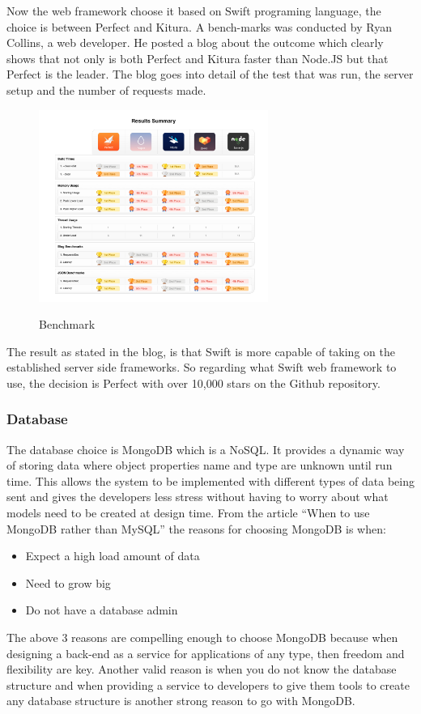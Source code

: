 Now the web framework choose it based on Swift programing language, the choice is between Perfect and Kitura. A bench-marks was conducted by Ryan Collins, a web developer. He posted a blog about the outcome \cite{benchmark} which clearly shows that not only is both Perfect and Kitura faster than Node.JS but that Perfect is the leader. The blog goes into detail of the test that was run, the server setup and the number of requests made.

\begin{figure}[!h]
    \caption{Benchmark}
    \centering
    \includegraphics[width=75mm]{images/benchmarks}
    \label{fig:label}
\end{figure}

The result as stated in the blog, is that Swift is more capable of taking on the established server side frameworks. So regarding what Swift web framework to use, the decision is Perfect with over 10,000 stars on the Github repository. \cite{github1} 

\subsubsection{Database}
The database choice is MongoDB which is a NoSQL. It provides a dynamic way of storing data where object properties name and type are unknown until run time. This allows the system to be implemented with different types of data being sent and gives the developers less stress without having to worry about what models need to be created at design time. From the article “When to use MongoDB rather than MySQL” \cite{database} the reasons for choosing MongoDB is when:
\begin{itemize}
  \item Expect a high load amount of data
  \item Need to grow big 
  \item Do not have a database admin
\end{itemize}
The above 3 reasons are compelling enough to choose MongoDB because when designing a back-end as a service for applications of any type, then freedom and flexibility are key. Another valid reason is when you do not know the database structure and when providing a service to developers to give them tools to create any database structure is another strong reason to go with MongoDB. 

